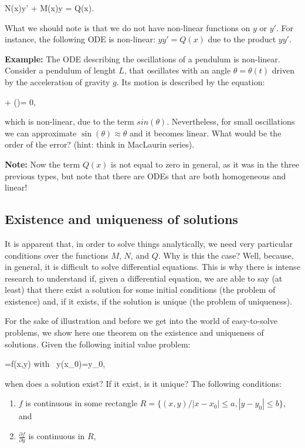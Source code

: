 \bnn N(x)y' + M(x)y = Q(x). \enn

What we should note is that we do not have non-linear functions on $y$ or $y'$. For instance, the following ODE is non-linear: $yy'=Q(x)$ due to the product $yy'$.

{\bf Example:} The ODE describing the oscillations of a pendulum is non-linear. Consider a pendulum of lenght $L$, that oscillates with an angle $\theta=\theta(t)$ driven by the acceleration of gravity $g$. Its motion is described by the equation:

\bnn {} + \sin(\theta)= 0, \enn

which is non-linear, due to the term $sin(\theta)$. Nevertheless, for small oscillations we can approximate $\sin(\theta)\approx \theta$ and it becomes linear. What would be the order of the error? (hint: think in MacLaurin series).

{\bf Note:} Now the term $Q(x)$ is not equal to zero in general, as it was in the three previous types, but note that there are ODEs that are both homogeneous and linear!

\subsection{Existence and uniqueness of solutions}

It is apparent that, in order to solve things analytically, we need very particular conditions over the functions $M$, $N$, and $Q$. Why is this the case? Well, because, in general, it is difficult to solve differential equations. This is why there is intense research to understand if, given a differential equation, we are able to say (at least) that there exist a solution for some initial conditions (the problem of existence) and, if it exists, if the solution is unique (the problem of uniqueness). 

For the sake of illustration and before we get into the world of easy-to-solve problems, we show here one theorem on the existence and uniqueness of solutions. Given the following initial value problem:

\bnn {}=f(x,y)  \quad \mbox{with } y(x_0)=y_0, \enn 

when does a solution exist? If it exist, is it unique? The following conditions:

\begin{enumerate}
	\item  $f$ is continuous in some rectangle $R=\{(x,y) / |x-x_0|\leq a, |y-y_0|\leq b\}$, and
	\item $\frac{\partial f}{\partial y}$ is continuous in $R$, 
\end{enumerate}

